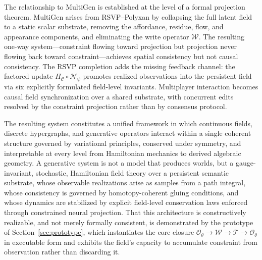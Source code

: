 \documentclass[11pt]{article}
\begin{document}
The relationship to MultiGen is established at the level of a formal
projection theorem.
MultiGen arises from RSVP--Polyxan by collapsing the full latent field to
a static scalar substrate, removing the affordance, residue, flow, and
appearance components, and eliminating the write operator $\mathcal{W}$.
The resulting one-way system---constraint flowing toward projection but
projection never flowing back toward constraint---achieves spatial
consistency but not causal consistency.
The RSVP completion adds the missing feedback channel: the factored update
$\Pi_{\mathcal{C}} \circ \mathcal{N}_\psi$ promotes realized observations
into the persistent field via six explicitly formulated field-level
invariants.
Multiplayer interaction becomes causal field synchronization over a shared
substrate, with concurrent edits resolved by the constraint projection
rather than by consensus protocol.

The resulting system constitutes a unified framework in which continuous
fields, discrete hypergraphs, and generative operators interact within a
single coherent structure governed by variational principles, conserved
under symmetry, and interpretable at every level from Hamiltonian mechanics
to derived algebraic geometry.
A generative system is not a model that produces worlds, but a
gauge-invariant, stochastic, Hamiltonian field theory over a persistent
semantic substrate, whose observable realizations arise as samples from a
path integral, whose consistency is governed by homotopy-coherent gluing
conditions, and whose dynamics are stabilized by explicit field-level
conservation laws enforced through constrained neural projection.
That this architecture is constructively realizable, and not merely
formally consistent, is demonstrated by the prototype of
Section~\ref{sec:prototype}, which instantiates the core closure
$\mathcal{O}_\theta \to \mathcal{W} \to \mathcal{T} \to \mathcal{O}_\theta$
in executable form and exhibits the field's capacity to accumulate
constraint from observation rather than discarding it.
\end{document}
